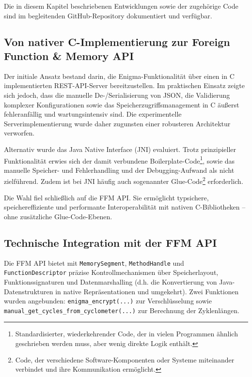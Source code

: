 \documentclass[12pt, ngerman, a4paper, numbers=noenddot]{article}
\begin{document}
Die in diesem Kapitel beschriebenen Entwicklungen sowie der zugehörige Code sind im begleitenden GitHub-Repository dokumentiert und verfügbar\autocite{steidle2025enigmaapi}.

\subsection{Von nativer C-Implementierung zur Foreign Function \& Memory API}
\label{subsec:ffm_evolution}

Der initiale Ansatz bestand darin, die Enigma-Funktionalität über einen in C implementierten REST-API-Server bereitzustellen. Im praktischen Einsatz zeigte sich jedoch, dass die manuelle De-/Serialisierung von JSON, die Validierung komplexer Konfigurationen sowie das Speicherzugriffsmanagement in C äußerst fehleranfällig und wartungsintensiv sind. Die experimentelle Serverimplementierung wurde daher zugunsten einer robusteren Architektur verworfen.

Alternativ wurde das Java Native Interface (JNI) evaluiert. Trotz prinzipieller Funktionalität erwies sich der damit verbundene Boilerplate-Code\footnote{Standardisierter, wiederkehrender Code, der in vielen Programmen ähnlich geschrieben werden muss, aber wenig direkte Logik enthält.}, sowie das manuelle Speicher- und Fehlerhandling und der Debugging-Aufwand als nicht zielführend. Zudem ist bei JNI häufig auch sogenannter Glue-Code\footnote{Code, der verschiedene Software-Komponenten oder Systeme miteinander verbindet und ihre Kommunikation ermöglicht.} erforderlich.


Die Wahl fiel schließlich auf die FFM API. Sie ermöglicht typsichere, speichereffiziente und performante Interoperabilität mit nativen C-Bibliotheken – ohne zusätzliche Glue-Code-Ebenen.

\newpage
\subsection{Technische Integration mit der FFM API}
\label{subsec:ffm_integration}

Die FFM API bietet mit \lstinline|MemorySegment|, \lstinline|MethodHandle| und \lstinline|FunctionDescriptor| präzise Kontrollmechanismen über Speicherlayout, Funktionssignaturen und Datenmarshalling (d.h. die Konvertierung von Java-Datenstrukturen in native Repräsentationen und umgekehrt). Zwei Funktionen wurden angebunden: \lstinline|enigma_encrypt(...)| zur Verschlüsselung sowie \newline\lstinline|manual_get_cycles_from_cyclometer(...)| zur Berechnung der Zyklenlängen.
\end{document}
